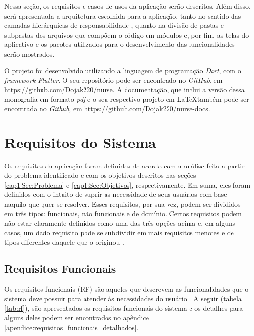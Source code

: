 
\label{Cap:Implementacao}
Nessa seção, os requisitos e casos de usos da aplicação serão descritos. Além disso, será apresentada a arquitetura escolhida para a aplicação, tanto no sentido das camadas hierárquicas de responsabilidade \cite{Faust2020}, quanto na divisão de pastas e subpastas dos arquivos que compõem o código em módulos e, por fim, as telas do aplicativo e os pacotes utilizados para o desenvolvimento das funcionalidades serão mostrados.

O projeto foi desenvolvido utilizando a linguagem de programação \textit{Dart}, com o \textit{framework Flutter}. O seu repositório pode ser encontrado no \textit{GitHub}, em \url{https://github.com/Dojak220/nurse}. A documentação, que inclui a versão dessa monografia em formato \textit{pdf} e o seu respectivo projeto em \LaTeX também pode ser encontrada no \textit{Github}, em \url{https://github.com/Dojak220/nurse-docs}.

\section{Requisitos do Sistema}
\label{cap4:Sec:Requisitos}

Os requisitos da aplicação foram definidos de acordo com a análise feita a partir do problema identificado e com os objetivos descritos nas seções \ref{cap1:Sec:Problema} e \ref{cap1:Sec:Objetivos}, respectivamente. Em suma, eles foram definidos com o intuito de suprir as necessidade de seus usuários com base naquilo que quer-se resolver. Esses requisitos, por sua vez, podem ser divididos em três tipos: funcionais, não funcionais e de domínio. Certos requisitos podem não estar claramente definidos como uma das três opções acima e, em alguns casos, um dado requisito pode se subdividir em mais requisitos menores e de tipos diferentes daquele que o originou \cite{sommerville2007engineering}. 

\subsection{Requisitos Funcionais}
\label{cap4:Subsec:RequisitosFuncionais}
Os requisitos funcionais (RF) são aqueles que descrevem as funcionalidades que o sistema deve possuir para atender às necessidades do usuário \cite{sommerville2007engineering}. A seguir (tabela \ref{tab:rf}), são apresentados os requisitos funcionais do sistema e os detalhes para alguns deles podem ser encontrados no apêndice \ref{apendice:requisitos_funcionais_detalhados}.

